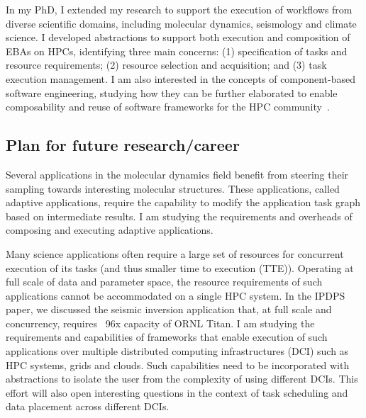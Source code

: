 In my PhD, I extended my research to support the execution of workflows from
diverse scientific domains, including molecular dynamics, seismology and
climate science. I developed abstractions to support both execution and
composition of EBAs on HPCs, identifying three main concerns: (1)
specification of tasks and resource requirements; (2) resource selection and
acquisition; and (3) task execution management. I am also interested in the
concepts of component-based software engineering, studying how they can be
further elaborated to enable composability and reuse of software frameworks
for the HPC community~\cite{review_bb_2016}.

\subsection{Plan for future research/career}

Several applications in the molecular dynamics field benefit from steering their
sampling towards interesting molecular structures. These applications, called
adaptive applications, require the capability to modify the application task 
graph based on intermediate results. I am studying the 
requirements and overheads of composing and executing adaptive applications.

Many science applications often require a large set of resources for concurrent 
execution of its tasks (and thus smaller time to execution (TTE)). Operating at 
full scale of data and parameter space, the resource requirements of such 
applications cannot be accommodated on a single HPC system. In the IPDPS paper, 
we discussed the seismic inversion application that, at full scale and 
concurrency, requires ~96x capacity of ORNL Titan.
I am studying the requirements and capabilities of frameworks that enable 
execution of such applications over multiple distributed computing 
infrastructures (DCI) such as HPC systems, grids and clouds. Such capabilities
need to be incorporated with abstractions to isolate the user from the 
complexity of using different DCIs. This effort will also open interesting 
questions in the context of task scheduling and data placement across different
DCIs.

